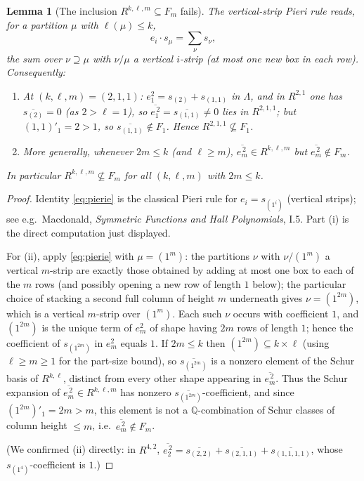 \documentclass{amsart}
\newtheorem{lemma}{Lemma}
\theoremstyle{definition}
\newcommand{\Q}{\mathbb{Q}}
\newcommand{\rkl}{R^{k,\ell}}
\newcommand{\Rklm}{R^{k,\ell,m}}
\begin{document}
\begin{lemma}[The inclusion $\Rklm\subseteq F_m$ fails]\label{lem:RnotinF}
The vertical-strip Pieri rule reads, for a partition $\mu$ with $\ell(\mu)\le k$,
\begin{equation}\label{eq:pierie}
e_i\cdot s_\mu=\sum_{\nu}s_\nu ,
\end{equation}
the sum over $\nu\supseteq\mu$ with $\nu/\mu$ a vertical $i$-strip (at most one new
box in each row). Consequently:
\begin{enumerate}
\item[\textup{(i)}] At $(k,\ell,m)=(2,1,1)$: $e_1^2=s_{(2)}+s_{(1,1)}$ in $\Lambda$,
and in $R^{2,1}$ one has $\overline{s_{(2)}}=0$ (as $2>\ell=1$), so
$\overline{e_1^{\,2}}=\overline{s_{(1,1)}}\neq0$ lies in $R^{2,1,1}$; but
$(1,1)'_1=2>1$, so $\overline{s_{(1,1)}}\notin F_1$. Hence $R^{2,1,1}\not\subseteq F_1$.
\item[\textup{(ii)}] More generally, whenever $2m\le k$ \textup{(}and $\ell\ge m$\textup{)},
$\overline{e_m^{\,2}}\in\Rklm$ but $\overline{e_m^{\,2}}\notin F_m$.
\end{enumerate}
In particular $\Rklm\not\subseteq F_m$ for all $(k,\ell,m)$ with $2m\le k$.
\end{lemma}

\begin{proof}
Identity \eqref{eq:pierie} is the classical Pieri rule for $e_i=s_{(1^i)}$
(vertical strips); see e.g.\ Macdonald, \emph{Symmetric Functions and Hall
Polynomials}, I.5. Part (i) is the direct computation just displayed.

For (ii), apply \eqref{eq:pierie} with $\mu=(1^m)$: the partitions $\nu$ with
$\nu/(1^m)$ a vertical $m$-strip are exactly those obtained by adding at most one box
to each of the $m$ rows (and possibly opening a new row of length $1$ below); the
particular choice of stacking a second full column of height $m$ underneath gives
$\nu=(1^{2m})$, which is a vertical $m$-strip over $(1^m)$. Each such $\nu$ occurs
with coefficient $1$, and $(1^{2m})$ is the unique term of $e_m^2$ of shape having
$2m$ rows of length $1$; hence the coefficient of $s_{(1^{2m})}$ in $e_m^2$ equals
$1$. If $2m\le k$ then $(1^{2m})\subseteq k\times\ell$ (using $\ell\ge m\ge1$ for the
part-size bound), so $\overline{s_{(1^{2m})}}$ is a nonzero element of the Schur basis
of $\rkl$, distinct from every other shape appearing in $\overline{e_m^{\,2}}$. Thus
the Schur expansion of $\overline{e_m^{\,2}}\in\Rklm$ has nonzero
$\overline{s_{(1^{2m})}}$-coefficient, and since $(1^{2m})'_1=2m>m$, this element is
not a $\Q$-combination of Schur classes of column height $\le m$, i.e.\
$\overline{e_m^{\,2}}\notin F_m$.

(We confirmed (ii) directly: in $R^{4,2}$, $\overline{e_2^{\,2}}=
\overline{s_{(2,2)}}+\overline{s_{(2,1,1)}}+\overline{s_{(1,1,1,1)}}$, whose
$s_{(1^4)}$-coefficient is $1$.)
\end{proof}
\end{document}

